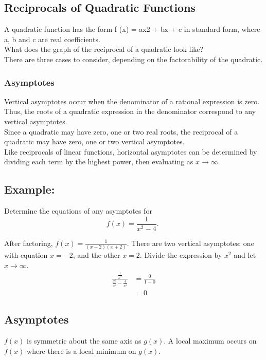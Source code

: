 \documentclass{article}
\begin{document}
\subsection{Reciprocals of Quadratic Functions}
A quadratic function has the form f (x) = ax2 + bx + c in
standard form, where a, b and c are real coefficients.\\
What does the graph of the reciprocal of a quadratic look
like?\\
There are three cases to consider, depending on the
factorability of the quadratic.
\subsubsection{Asymptotes}
Vertical asymptotes occur when the denominator of a
rational expression is zero. Thus, the roots of a quadratic expression in the denominator correspond to any vertical asymptotes.\\
Since a quadratic may have zero, one or two real roots, the
reciprocal of a quadratic may have zero, one or two vertical
asymptotes.\\

Like reciprocals of linear functions, horizontal asymptotes can
be determined by dividing each term by the highest power,
then evaluating as $x\to\infty$.
\subsection*{Example:}
Determine the equations of any asymptotes for
$$
f(x)=\frac{1}{x^2-4} \text {. }
$$

After factoring, $f(x)=\frac{1}{(x-2)(x+2)}$.
There are two vertical asymptotes: one with equation $x=-2$, and the other $x=2$.
Divide the expression by $x^2$ and let $x \rightarrow \infty$.
$$
\begin{aligned}
\frac{\frac{1}{x^2}}{\frac{x^2}{x^2}-\frac{4}{x^2}} & =\frac{0}{1-0} \\
& =0
\end{aligned}
$$
\subsection*{Asymptotes}

\begin{minipage}{0.6\textwidth}
\end{minipage}%
\begin{minipage}{0.4\textwidth}
$f(x)$ is symmetric about the same axis as $g(x)$. A local maximum occurs on $f(x)$ where there is a local minimum on $g(x)$.
\end{minipage}
\end{document}
